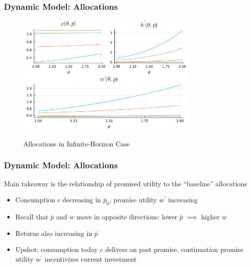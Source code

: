 \documentclass{beamer}
\begin{document}
\begin{frame}
    \frametitle{Dynamic Model: Allocations}

    \begin{figure}[htbp]
        \centering
        \caption{Allocations in Infinite-Horizon Case}
        \includegraphics[width = 0.8\textwidth]{figures/inf_allocs_tnorm.png}
        \label{fig:inf_allocs}
    \end{figure}

\end{frame}

\begin{frame}
    \frametitle{Dynamic Model: Allocations}

    Main takeaway is the relationship of promised utility to the ``baseline'' allocations 
    \begin{itemize}
        \item Consumption \( c \) decreasing in \( \bar{p}_0 \), promise utility \( w^\prime \) increasing 
        \item Recall that \( \bar{p} \) and \( w \) move in opposite directions: lower \( \bar{p} \) \( \implies \) higher \( w \)
        \item Returns also increasing in \( \bar{p} \) 
        \item Upshot: consumption today \( c \) delivers on past promise, continuation promise utility \( w^\prime \) incentivizes current investment
    \end{itemize}

\end{frame}
\end{document}
